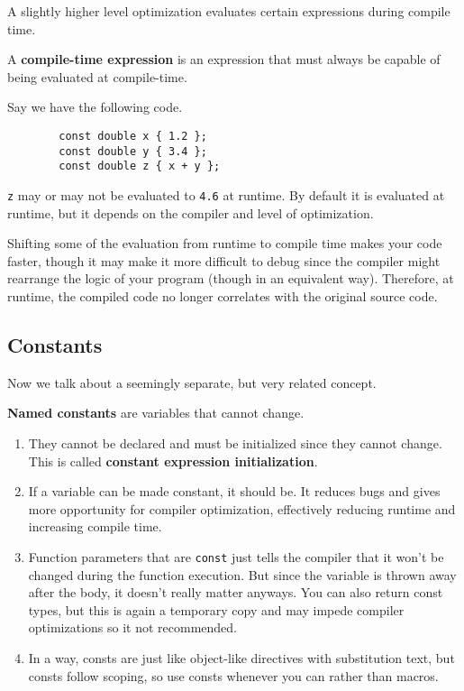 \documentclass{article}
\begin{document}
    A slightly higher level optimization evaluates certain expressions during compile time. 

    \begin{definition}
      A \textbf{compile-time expression} is an expression that must always be capable of being evaluated at compile-time. 
    \end{definition}

    \begin{example}
      Say we have the following code. 
      \begin{lstlisting}
        const double x { 1.2 };
        const double y { 3.4 };
        const double z { x + y }; 
      \end{lstlisting} 
      \texttt{z} may or may not be evaluated to \texttt{4.6} at runtime. By default it is evaluated at runtime, but it depends on the compiler and level of optimization. 
    \end{example}

    Shifting some of the evaluation from runtime to compile time makes your code faster, though it may make it more difficult to debug since the compiler might rearrange the logic of your program (though in an equivalent way). Therefore, at runtime, the compiled code no longer correlates with the original source code. 
  
  \subsection{Constants}

    Now we talk about a seemingly separate, but very related concept. 

    \begin{definition}
      \textbf{Named constants} are variables that cannot change. 
      \begin{enumerate}
        \item They cannot be declared and must be initialized since they cannot change. This is called \textbf{constant expression initialization}.
        \item If a variable can be made constant, it should be. It reduces bugs and gives more opportunity for compiler optimization, effectively reducing runtime and increasing compile time. 
        \item Function parameters that are \texttt{const} just tells the compiler that it won't be changed during the function execution. But since the variable is thrown away after the body, it doesn't really matter anyways. You can also return const types, but this is again a temporary copy and may impede compiler optimizations so it not recommended. 
        \item In a way, consts are just like object-like directives with substitution text, but consts follow scoping, so use consts whenever you can rather than macros. 
      \end{enumerate}
    \end{definition}
\end{document}
